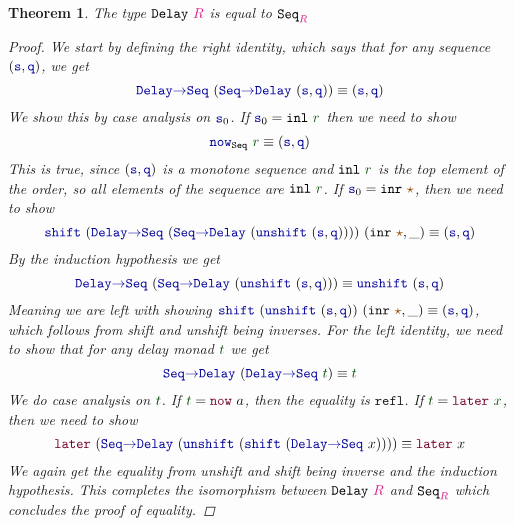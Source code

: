 \documentclass[twoside,11pt,openright]{report}
\theoremstyle{plain} %
\newtheorem{thm}{Theorem}[section]
\theoremstyle{definition}
\theoremstyle{remark}
\newcommand*{\term}[1]{\textcolor{green!30!black}{#1}} %
\newcommand*{\type}[1]{\textcolor{magenta!90!black}{#1}}
\newcommand*{\constant}[1]{\textcolor{orange!60!black}{\ensuremath{\mathtt{#1}}}}
\newcommand*{\function}[1]{\textcolor{blue!60!black}{\ensuremath{\mathtt{#1}}}}
\newcommand*{\constructor}[1]{\textcolor{purple!60!black}{\ensuremath{\mathtt{#1}}}}
\newcommand*{\typeformer}[1]{\ensuremath{\mathtt{#1}}}
\newcommand*{\unitelem}{\constant{\star}} %
\begin{document}
\begin{thm}
  \label{thm:seq-eq-delay}
  The type \(\typeformer{Delay}~\type{R}\) is equal to \(\typeformer{Seq}_{\type{R}}\)
  \begin{proof}  
    We start by defining the right identity, which says that for any sequence \((\function{s},\function{q})\), we get
    \begin{equation}
      \function{Delay{\rightarrow}Seq}~(\function{Seq{\rightarrow}Delay}~(\function{s},\function{q})) \equiv (\function{s},\function{q})
    \end{equation}
    We show this by case analysis on \(\function{s}_0\). If \(\function{s}_0 = \mathtt{inl}~\term{r}\) then we need to show
    \begin{equation}
      \function{now}_{\typeformer{Seq}}~\term{r} \equiv (\function{s},\function{q})
    \end{equation}
    This is true, since \((\function{s},\function{q})\) is a monotone sequence and \(\mathtt{inl}~\term{r}\) is the top element of the order, so all elements of the sequence are \(\mathtt{inl}~\term{r}\). If \(\function{s}_0 = \mathtt{inr}~\unitelem\), then we need to show
    \begin{equation}
      \function{shift}~(\function{Delay{\rightarrow}Seq}~(\function{Seq{\rightarrow}Delay}~(\function{unshift}~(\function{s},\function{q}))))~(\mathtt{inr}~\unitelem,\_) \equiv (\function{s},\function{q})
    \end{equation}
    By the induction hypothesis we get
    \begin{equation}
      \function{Delay{\rightarrow}Seq}~(\function{Seq{\rightarrow}Delay}~(\function{unshift}~(\function{s},\function{q}))) \equiv \function{unshift}~(\function{s},\function{q})
    \end{equation}
    Meaning we are left with showing \(\function{shift}~(\function{unshift}~(\function{s},\function{q}))~(\texttt{inr}~\unitelem,\_) \equiv (\function{s},\function{q})\), which follows from shift and unshift being inverses. For the left identity, we need to show that for any delay monad \(\term{t}\) we get
    \begin{equation}
      \function{Seq{\rightarrow}Delay}~(\function{Delay{\rightarrow}Seq}~\term{t}) \equiv \term{t}
    \end{equation}
    We do case analysis on \(\term{t}\). If \(\term{t} = \constructor{now}~a\), then the equality is \(\mathtt{refl}\). If \(\term{t} = \constructor{later}~\term{x}\), then we need to show
    \begin{equation}
      \constructor{later}~(\function{Seq{\rightarrow}Delay}~(\function{unshift}~(\function{shift}~(\function{Delay{\rightarrow}Seq}~x)))) \equiv \constructor{later}~x
    \end{equation}
    We again get the equality from unshift and shift being inverse and the induction hypothesis. This completes the isomorphism between \(\typeformer{Delay}~\type{R}\) and \(\typeformer{Seq}_{\type{R}}\) which concludes the proof of equality.
  \end{proof}
\end{thm}
\end{document}
